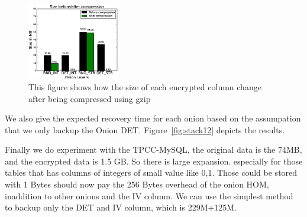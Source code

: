 


\begin{figure}   
  \begin{minipage}[t]{0.5\linewidth}  
    \centering   
    \includegraphics[width=4.0cm]{images/aftercompression.eps}   
    \caption{This figure shows how the size of each encrypted column change after being compressed using gzip}   
    \label{fig:side:a}   
  \end{minipage}%
\end{figure}





We also give the expected recovery time for each onion based on the assumpation that we only backup the Onion DET. Figure~\ref{fig:stack12} depicts the results.


Finally we do experiment with the TPCC-MySQL, the original data is the 74MB, and the encrypted data is 1.5 GB. So there is large expansion. especially for those tables that has columns of integers of small value like 0,1. Those could be stored with 1 Bytes should now pay the 256 Bytes overhead of the onion HOM, inaddition to other onions and the IV column. We can use the simplest method to backup only the DET and IV column, which is 229M+125M. 


